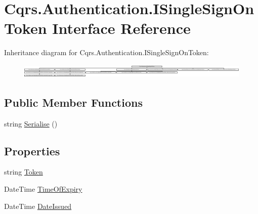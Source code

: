 \hypertarget{interfaceCqrs_1_1Authentication_1_1ISingleSignOnToken}{}\section{Cqrs.\+Authentication.\+I\+Single\+Sign\+On\+Token Interface Reference}
\label{interfaceCqrs_1_1Authentication_1_1ISingleSignOnToken}
Inheritance diagram for Cqrs.\+Authentication.\+I\+Single\+Sign\+On\+Token\+:\begin{figure}[H]
\begin{center}
\leavevmode
\includegraphics[height=0.686695cm]{interfaceCqrs_1_1Authentication_1_1ISingleSignOnToken}
\end{center}
\end{figure}
\subsection*{Public Member Functions}
\begin{DoxyCompactItemize}
\item 
string \hyperlink{interfaceCqrs_1_1Authentication_1_1ISingleSignOnToken_af34e8c0b052865d687064d3381bfbcdb}{Serialise} ()
\end{DoxyCompactItemize}
\subsection*{Properties}
\begin{DoxyCompactItemize}
\item 
string \hyperlink{interfaceCqrs_1_1Authentication_1_1ISingleSignOnToken_aba74aff1a43375dce8d80fa94a94a57b}{Token}
\item 
Date\+Time \hyperlink{interfaceCqrs_1_1Authentication_1_1ISingleSignOnToken_a50af484569cc78f88acb01f1938a7cd8}{Time\+Of\+Expiry}
\item 
Date\+Time \hyperlink{interfaceCqrs_1_1Authentication_1_1ISingleSignOnToken_a0c41d76beea893838e556fba8dbc59db}{Date\+Issued}
\end{DoxyCompactItemize}


